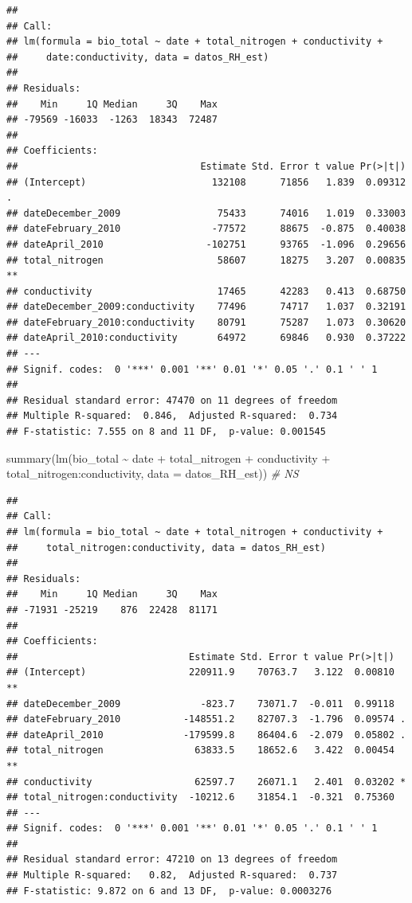\documentclass[
]{book}
\newenvironment{Shaded}{\begin{snugshade}}{\end{snugshade}}
\newcommand{\AttributeTok}[1]{\textcolor[rgb]{0.77,0.63,0.00}{#1}}
\newcommand{\CommentTok}[1]{\textcolor[rgb]{0.56,0.35,0.01}{\textit{#1}}}
\newcommand{\FunctionTok}[1]{\textcolor[rgb]{0.00,0.00,0.00}{#1}}
\newcommand{\NormalTok}[1]{#1}
\newcommand{\SpecialCharTok}[1]{\textcolor[rgb]{0.00,0.00,0.00}{#1}}
\begin{document}
\begin{verbatim}
## 
## Call:
## lm(formula = bio_total ~ date + total_nitrogen + conductivity + 
##     date:conductivity, data = datos_RH_est)
## 
## Residuals:
##    Min     1Q Median     3Q    Max 
## -79569 -16033  -1263  18343  72487 
## 
## Coefficients:
##                                Estimate Std. Error t value Pr(>|t|)   
## (Intercept)                      132108      71856   1.839  0.09312 . 
## dateDecember_2009                 75433      74016   1.019  0.33003   
## dateFebruary_2010                -77572      88675  -0.875  0.40038   
## dateApril_2010                  -102751      93765  -1.096  0.29656   
## total_nitrogen                    58607      18275   3.207  0.00835 **
## conductivity                      17465      42283   0.413  0.68750   
## dateDecember_2009:conductivity    77496      74717   1.037  0.32191   
## dateFebruary_2010:conductivity    80791      75287   1.073  0.30620   
## dateApril_2010:conductivity       64972      69846   0.930  0.37222   
## ---
## Signif. codes:  0 '***' 0.001 '**' 0.01 '*' 0.05 '.' 0.1 ' ' 1
## 
## Residual standard error: 47470 on 11 degrees of freedom
## Multiple R-squared:  0.846,  Adjusted R-squared:  0.734 
## F-statistic: 7.555 on 8 and 11 DF,  p-value: 0.001545
\end{verbatim}

\begin{Shaded}
\begin{Highlighting}[]
\FunctionTok{summary}\NormalTok{(}\FunctionTok{lm}\NormalTok{(bio\_total }\SpecialCharTok{\textasciitilde{}}\NormalTok{ date }\SpecialCharTok{+}\NormalTok{ total\_nitrogen }\SpecialCharTok{+}\NormalTok{ conductivity }\SpecialCharTok{+}\NormalTok{ total\_nitrogen}\SpecialCharTok{:}\NormalTok{conductivity, }\AttributeTok{data =}\NormalTok{ datos\_RH\_est))  }\CommentTok{\# NS}
\end{Highlighting}
\end{Shaded}

\begin{verbatim}
## 
## Call:
## lm(formula = bio_total ~ date + total_nitrogen + conductivity + 
##     total_nitrogen:conductivity, data = datos_RH_est)
## 
## Residuals:
##    Min     1Q Median     3Q    Max 
## -71931 -25219    876  22428  81171 
## 
## Coefficients:
##                              Estimate Std. Error t value Pr(>|t|)   
## (Intercept)                  220911.9    70763.7   3.122  0.00810 **
## dateDecember_2009              -823.7    73071.7  -0.011  0.99118   
## dateFebruary_2010           -148551.2    82707.3  -1.796  0.09574 . 
## dateApril_2010              -179599.8    86404.6  -2.079  0.05802 . 
## total_nitrogen                63833.5    18652.6   3.422  0.00454 **
## conductivity                  62597.7    26071.1   2.401  0.03202 * 
## total_nitrogen:conductivity  -10212.6    31854.1  -0.321  0.75360   
## ---
## Signif. codes:  0 '***' 0.001 '**' 0.01 '*' 0.05 '.' 0.1 ' ' 1
## 
## Residual standard error: 47210 on 13 degrees of freedom
## Multiple R-squared:   0.82,  Adjusted R-squared:  0.737 
## F-statistic: 9.872 on 6 and 13 DF,  p-value: 0.0003276
\end{verbatim}
\end{document}
